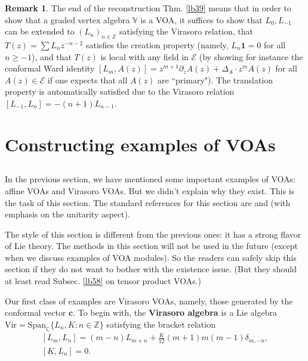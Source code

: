 \documentclass[11pt,b5paper,notitlepage]{article}
\theoremstyle{definition}
\newtheorem{rem}[df]{Remark}
\theoremstyle{plain}
\newcommand{\mc}{\mathcal}
\newcommand{\id}{\mathbf{1}}
\newcommand{\Vir}{\mathrm{Vir}}
\newcommand{\Span}{\mathrm{Span}}
\newcommand{\Vbb}{\mathbb V}
\newcommand{\Cbb}{\mathbb C}
\newcommand{\Zbb}{\mathbb Z}
\newcommand{\cbf}{\mathbf c}
\numberwithin{equation}{section}
\begin{document}
\begin{rem}\label{lb44}
The end of the reconstruction Thm. \ref{lb39} means that in order to show that a graded vertex algebra $\Vbb$ is a VOA, it suffices to show that $L_0,L_{-1}$ can be extended to $(L_n)_{n\in\Zbb}$ satisfying the Virasoro relation, that $T(z)=\sum L_nz^{-n-2}$ satisfies the creation property (namely, $L_n\id=0$ for all $n\geq-1$), and that $T(z)$ is local with any field in $\mc E$ (by showing for instance the conformal Ward identity $[L_m,A(z)]=z^{m+1}\partial_zA(z)+\Delta_A\cdot z^mA(z)$ for all $A(z)\in\mc E$ if one expects that all $A(z)$ are ``primary"). The translation property is automatically satisfied due to the Virasoro relation $[L_{-1},L_n]=-(n+1)L_{n-1}$.
\end{rem}




\section{Constructing examples of VOAs}



\subsection{}
In the previous section, we have mentioned some important examples of VOAs:  affine VOAs and Virasoro VOAs. But we didn't explain why they exist. This is the task of this section. The standard references for this section  are \cite[Chapter 6]{LL} and \cite{Was10} (with emphasis on the unitarity aspect). 

The style of this section is different from the previous ones: it has a strong flavor of Lie theory. The methods in this section will not be used in the future (except when we discuss examples of VOA modules). So the readers can safely skip this section if they do not want to bother with the existence issue. (But they should at least read Subsec. \ref{lb58} on tensor product VOAs.)

Our first class of examples are Virasoro VOAs, namely, those generated by the conformal vector $\cbf$. To begin with, the \textbf{Virasoro algebra} is a Lie algebra $\Vir=\Span_\Cbb\{L_n,K:n\in\Zbb\}$ satisfying the bracket relation
\begin{subequations}
\begin{gather*}
		[L_m,L_n]=(m-n)L_{m+n}+\frac K{12}(m+1)m(m-1)\delta_{m,-n},\\
		[K,L_n]=0.	
\end{gather*}
\end{subequations}
\end{document}
